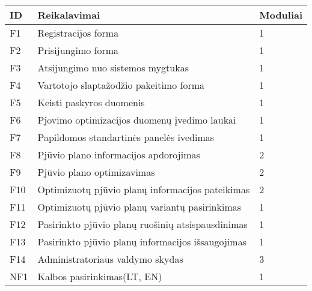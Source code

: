 \documentclass[a4paper,12pt]{article}
\begin{document}
\begin{frame}
\centering

\label{my-label}
\begin{tabular}{|l|l|l|}
\hline
\textbf{ID}	& \textbf{Reikalavimai}						& \textbf{Moduliai}  \\ \hline

F1	& Registracijos forma								& 1     		\\ \hline

F2	& Prisijungimo forma									& 1			\\ \hline

F3	& Atsijungimo nuo sistemos mygtukas					& 1			\\ \hline

F4	& Vartotojo slaptažodžio pakeitimo forma				& 1			\\ \hline

F5	& Keisti paskyros duomenis	 	  					& 1			\\ \hline 

F6	& Pjovimo optimizacijos duomenų įvedimo laukai		& 1			\\ \hline

F7  & Papildomos standartinės panelės ivedimas 			& 1			\\ \hline

F8 & Pjūvio plano informacijos apdorojimas				& 2			\\ \hline

F9	& Pjūvio plano optimizavimas           	   			& 2			\\ \hline

F10	& Optimizuotų pjūvio planų informacijos pateikimas	& 2     		\\ \hline

F11	& Optimizuotų pjūvio planų variantų pasirinkimas		& 1			\\ \hline

F12	& Pasirinkto pjūvio planų ruošinių atsispausdinimas	& 1			\\ \hline

F13	& Pasirinkto pjūvio planų informacijos išsaugojimas	& 1			\\ \hline

F14	& Administratoriaus valdymo skydas	 	  			& 3			\\ \hline

NF1	& Kalbos pasirinkimas(LT, EN)						& 1			\\ \hline

\end{tabular}
\end{frame}
\end{document}
